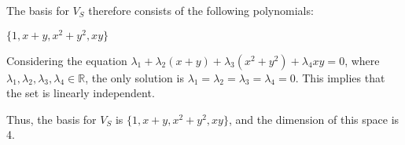 \documentclass[12pt]{article}
\begin{document}
    The basis for \( V_S \) therefore consists of the following polynomials:
    \begin{center}
        \(\{1, x + y, x^2 + y^2, xy\}\)
    \end{center}

    Considering the equation \(\lambda_1 + \lambda_2 (x+y) + \lambda_3 (x^2+y^2) + \lambda_4 xy = 0\), where \(\lambda_1, \lambda_2, \lambda_3, \lambda_4 \in \mathbb{R}\), the only solution is \(\lambda_1 = \lambda_2 = \lambda_3 = \lambda_4 = 0\). This implies that the set is linearly independent.

    Thus, the basis for \( V_S \) is \(\{1, x+y, x^2+y^2, xy\}\), and the dimension of this space is 4.
\end{document}
